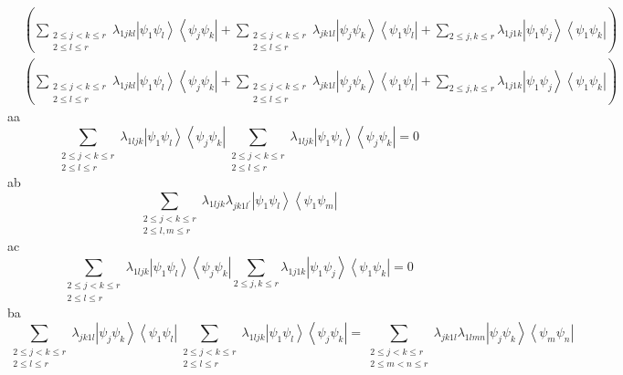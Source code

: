 \documentclass[aps,preprint]{revtex4}%
\begin{document}
\begin{align}
&  \left(  \sum_{\substack{2\leq j<k\leq r\\2\leq l\leq r}}\lambda
_{1jkl}\left\vert \psi_{1}\psi_{l}\right\rangle \left\langle \psi_{j}\psi
_{k}\right\vert +\sum_{\substack{2\leq j<k\leq r\\2\leq l\leq r}%
}\lambda_{jk1l}\left\vert \psi_{j}\psi_{k}\right\rangle \left\langle \psi
_{1}\psi_{l}\right\vert +\sum_{2\leq j,k\leq r}\lambda_{1j1k}\left\vert
\psi_{1}\psi_{j}\right\rangle \left\langle \psi_{1}\psi_{k}\right\vert
\right)  \\
&  \left(  \sum_{\substack{2\leq j<k\leq r\\2\leq l\leq r}}\lambda
_{1jkl}\left\vert \psi_{1}\psi_{l}\right\rangle \left\langle \psi_{j}\psi
_{k}\right\vert +\sum_{\substack{2\leq j<k\leq r\\2\leq l\leq r}%
}\lambda_{jk1l}\left\vert \psi_{j}\psi_{k}\right\rangle \left\langle \psi
_{1}\psi_{l}\right\vert +\sum_{2\leq j,k\leq r}\lambda_{1j1k}\left\vert
\psi_{1}\psi_{j}\right\rangle \left\langle \psi_{1}\psi_{k}\right\vert
\right)
\end{align}
aa%
\begin{equation}
\sum_{\substack{2\leq j<k\leq r\\2\leq l\leq r}}\lambda_{1ljk}\left\vert
\psi_{1}\psi_{l}\right\rangle \left\langle \psi_{j}\psi_{k}\right\vert
\sum_{\substack{2\leq j<k\leq r\\2\leq l\leq r}}\lambda_{1ljk}\left\vert
\psi_{1}\psi_{l}\right\rangle \left\langle \psi_{j}\psi_{k}\right\vert =0
\end{equation}
ab%
\begin{equation}
\sum_{\substack{2\leq j<k\leq r\\2\leq l,m\leq r}}\lambda_{1ljk}%
\lambda_{jk1l^{\prime}}\left\vert \psi_{1}\psi_{l}\right\rangle \left\langle
\psi_{1}\psi_{m}\right\vert
\end{equation}
ac%
\begin{equation}
\sum_{\substack{2\leq j<k\leq r\\2\leq l\leq r}}\lambda_{1ljk}\left\vert
\psi_{1}\psi_{l}\right\rangle \left\langle \psi_{j}\psi_{k}\right\vert
\sum_{2\leq j,k\leq r}\lambda_{1j1k}\left\vert \psi_{1}\psi_{j}\right\rangle
\left\langle \psi_{1}\psi_{k}\right\vert =0
\end{equation}
ba%
\begin{equation}
\sum_{\substack{2\leq j<k\leq r\\2\leq l\leq r}}\lambda_{jk1l}\left\vert
\psi_{j}\psi_{k}\right\rangle \left\langle \psi_{1}\psi_{l}\right\vert
\sum_{\substack{2\leq j<k\leq r\\2\leq l\leq r}}\lambda_{1ljk}\left\vert
\psi_{1}\psi_{l}\right\rangle \left\langle \psi_{j}\psi_{k}\right\vert
=\sum_{\substack{2\leq j<k\leq r\\2\leq m<n\leq r}}\lambda_{jk1l}%
\lambda_{1lmn}\left\vert \psi_{j}\psi_{k}\right\rangle \left\langle \psi
_{m}\psi_{n}\right\vert
\end{equation}
\end{document}
